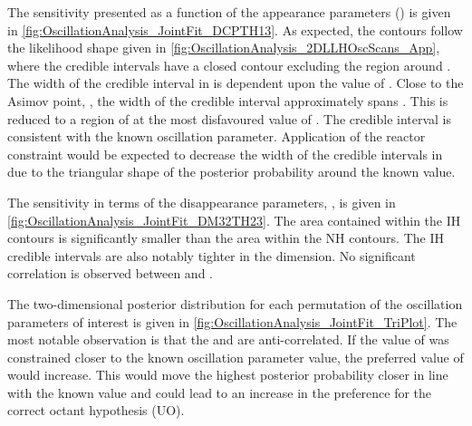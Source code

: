 \clearpage

The sensitivity presented as a function of the appearance parameters () is given in \autoref{fig:OscillationAnalysis_JointFit_DCPTH13}. As expected, the contours follow the likelihood shape given in \autoref{fig:OscillationAnalysis_2DLLHOscScans_App}, where the \quickmath{2\sigma} credible intervals have a closed contour excluding the region around . The width of the \quickmath{3\sigma} credible interval in  is dependent upon the value of . Close to the Asimov point, , the width of the \quickmath{3\sigma} credible interval approximately spans . This is reduced to a region of  at the most disfavoured value of .
The \quickmath{1\sigma} credible interval is consistent with the known oscillation parameter. Application of the reactor constraint would be expected to decrease the width of the \quickmath{1\sigma} credible intervals in  due to the triangular shape of the posterior probability around the known value. 

The sensitivity in terms of the disappearance parameters, , is given in \autoref{fig:OscillationAnalysis_JointFit_DM32TH23}. The area contained within the IH contours is significantly smaller than the area within the NH contours. The IH credible intervals are also notably tighter in the  dimension. No significant correlation is observed between  and .

The two-dimensional posterior distribution for each permutation of the oscillation parameters of interest is given in \autoref{fig:OscillationAnalysis_JointFit_TriPlot}. The most notable observation is that the  and  are anti-correlated. If the value of  was constrained closer to the known oscillation parameter value, the preferred value of  would increase. This would move the highest posterior probability closer in line with the known value and could lead to an increase in the preference for the correct octant hypothesis (UO).

